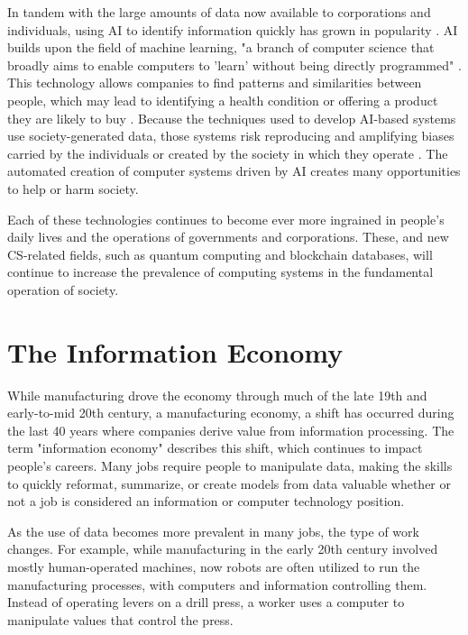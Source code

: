 
In tandem with the large amounts of data now available to corporations and individuals, using AI to identify information quickly has grown in popularity \parencite{vinichenko_threats_2021}. AI builds upon the field of machine learning, "a branch of computer science that broadly aims to enable computers to 'learn' without being directly programmed" \parencite[p. 2222]{bi_what_2019}. This technology allows companies to find patterns and similarities between people, which may lead to identifying a health condition or offering a product they are likely to buy \parencite{fennelly_for_2021, ma_machine_2020}. Because the techniques used to develop AI-based systems use society-generated data, those systems risk reproducing and amplifying biases carried by the individuals or created by the society in which they operate \parencite{wiens_diagnosing_2020}. The automated creation of computer systems driven by AI creates many opportunities to help or harm society.

Each of these technologies continues to become ever more ingrained in people's daily lives and the operations of governments and corporations. These, and new CS-related fields, such as quantum computing and blockchain databases, will continue to increase the prevalence of computing systems in the fundamental operation of society.



\section{The Information Economy}

While manufacturing drove the economy through much of the late 19th and early-to-mid 20th century, a manufacturing economy, a shift has occurred during the last 40 years where companies derive value from information processing. The term "information economy" describes this shift, which continues to impact people's careers. Many jobs require people to manipulate data, making the skills to quickly reformat, summarize, or create models from data valuable whether or not a job is considered an information or computer technology position.

As the use of data becomes more prevalent in many jobs, the type of work changes. For example, while manufacturing in the early 20th century involved mostly human-operated machines, now robots are often utilized to run the manufacturing processes, with computers and information controlling them. Instead of operating levers on a drill press, a worker uses a computer to manipulate values that control the press.

